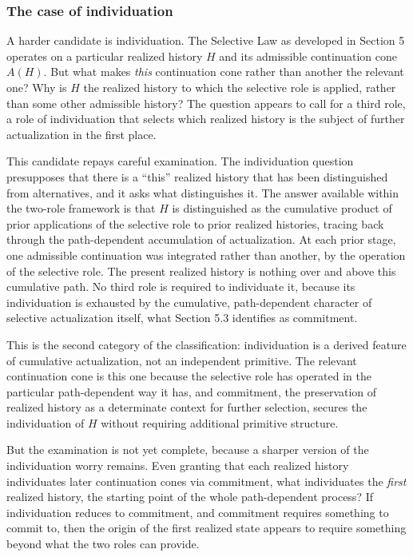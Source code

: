 \documentclass[11pt]{article}
\theoremstyle{foundation}
\begin{document}
\subsubsection{The case of individuation}

A harder candidate is individuation. The Selective Law as developed in Section 5 operates on a particular realized history $H$ and its admissible continuation cone $A(H)$. But what makes \emph{this} continuation cone rather than another the relevant one? Why is $H$ the realized history to which the selective role is applied, rather than some other admissible history? The question appears to call for a third role, a role of individuation that selects which realized history is the subject of further actualization in the first place.

This candidate repays careful examination. The individuation question presupposes that there is a ``this'' realized history that has been distinguished from alternatives, and it asks what distinguishes it. The answer available within the two-role framework is that $H$ is distinguished as the cumulative product of prior applications of the selective role to prior realized histories, tracing back through the path-dependent accumulation of actualization. At each prior stage, one admissible continuation was integrated rather than another, by the operation of the selective role. The present realized history is nothing over and above this cumulative path. No third role is required to individuate it, because its individuation is exhausted by the cumulative, path-dependent character of selective actualization itself, what Section 5.3 identifies as commitment.

This is the second category of the classification: individuation is a derived feature of cumulative actualization, not an independent primitive. The relevant continuation cone is this one because the selective role has operated in the particular path-dependent way it has, and commitment, the preservation of realized history as a determinate context for further selection, secures the individuation of $H$ without requiring additional primitive structure.

But the examination is not yet complete, because a sharper version of the individuation worry remains. Even granting that each realized history individuates later continuation cones via commitment, what individuates the \emph{first} realized history, the starting point of the whole path-dependent process? If individuation reduces to commitment, and commitment requires something to commit to, then the origin of the first realized state appears to require something beyond what the two roles can provide.
\end{document}
